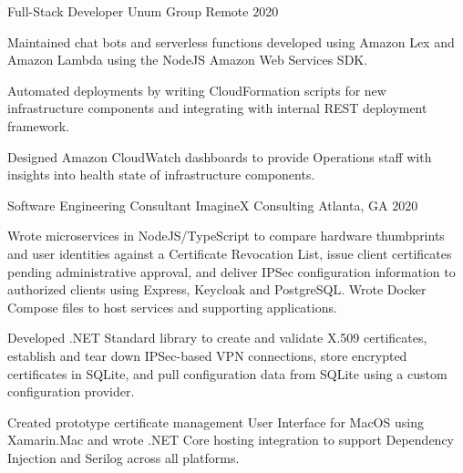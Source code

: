 

\begin{cventries}

  \cventry
    {Full-Stack Developer} %
    {Unum Group} %
    {Remote} %
    {2020} %
    {
      \begin{cvitems}
        \item {Maintained chat bots and serverless functions developed using Amazon Lex and Amazon Lambda using the NodeJS Amazon Web Services SDK.}
        \item {Automated deployments by writing CloudFormation scripts for new infrastructure components and integrating with internal REST deployment framework.}
        \item {Designed Amazon CloudWatch dashboards to provide Operations staff with insights into health state of infrastructure components.}
      \end{cvitems}
    }

  \cventry
    {Software Engineering Consultant} %
    {ImagineX Consulting} %
    {Atlanta, GA} %
    {2020} %
    {
      \begin{cvitems} %
        \item {Wrote microservices in NodeJS/TypeScript to compare hardware thumbprints and user identities against a Certificate Revocation List, issue client certificates pending administrative approval, and deliver IPSec configuration information to authorized clients using Express, Keycloak and PostgreSQL. Wrote Docker Compose files to host services and supporting applications.}
        \item {Developed .NET Standard library to create and validate X.509 certificates, establish and tear down IPSec-based VPN connections, store encrypted certificates in SQLite, and pull configuration data from SQLite using a custom configuration provider.}
        \item {Created prototype certificate management User Interface for MacOS using Xamarin.Mac and wrote .NET Core hosting integration to support Dependency Injection and Serilog across all platforms.}
      \end{cvitems}
    }


\end{cventries}
